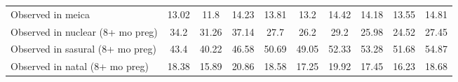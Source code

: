 \begin{tabular}{l*{9}{c}}
Observed in meica   &       13.02&        11.8&       14.23&       13.81&        13.2&       14.42&       14.18&       13.55&       14.81\\
Observed in nuclear (8+ mo preg)&        34.2&       31.26&       37.14&        27.7&        26.2&        29.2&       25.98&       24.52&       27.45\\
Observed in sasural (8+ mo preg)&        43.4&       40.22&       46.58&       50.69&       49.05&       52.33&       53.28&       51.68&       54.87\\
Observed in natal (8+ mo preg)&       18.38&       15.89&       20.86&       18.58&       17.25&       19.92&       17.45&       16.23&       18.68\\
\bottomrule
\end{tabular}
